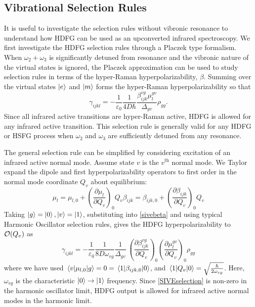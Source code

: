 \documentclass[aip, jcp, reprint, onecolumn, nofootinbib]{revtex4-2}
\begin{document}
\subsection{Vibrational Selection Rules}

It is useful to investigate the selection rules without vibronic resonance to understand how HDFG can be used as an upconverted infrared spectroscopy.
We first investigate the HDFG selection rules through a Placzek type formalism.
When $\omega_2+\omega_3$ is significantly detuned from resonance and the vibronic nature of the virtual states is ignored, the Placzek approximation can be used to study selection rules in terms of the hyper-Raman hyperpolarizability, $\beta$. \cite{Placzek1934, Long1970}
Summing over the virtual states $\ket{e}$ and $\ket{m}$ forms the hyper-Raman hyperpolarizability so that\cite{Long1970} 
\begin{equation}\label{sivebeta}
	\gamma_{ijkl} =	-\frac{1}{\varepsilon_0} \frac{1}{4D \hbar}\frac{\beta^{vg}_{ijk} \mu^{gv}_{l}}{\Delta_{gv}} \rho_{gg}.
\end{equation}
Since all infrared active transitions are hyper-Raman active, HDFG is allowed for any infrared active transition. \cite{Andrews1978}
This selection rule is generally valid for any HDFG or HSFG process when $\omega_2$ and $\omega_3$ are sufficiently detuned from any resonance.

The general selection rule can be simplified by considering excitation of an infrared active normal mode.  
Assume state $v$ is the $v^{\text{th}}$ normal mode.
We Taylor expand the dipole and first hyperpolarizability operators to first order in the normal mode coordinate $Q_v$ about equilibrium:\cite{Long1970, Shen90}
\begin{subequations}
	\begin{equation}
		\mu_l = \mu_{l,0} + \left(\frac{\partial \mu_l}{\partial Q_v}\right)_0 Q_v 
	\end{equation}
	\begin{equation}
		\beta_{ijk} = \beta_{ijk,0} + \left(\frac{\partial \beta_{ijk}}{\partial Q_v}\right)_0 Q_v
	\end{equation}
\end{subequations}
Taking $\ket{g} = \ket{0}, \ket{v} = \ket{1}$, substituting into \autoref{sivebeta} and using typical Harmonic Oscillator selection rules, gives the HDFG hyperpolarizability to $\order{Q_v}$ as \begin{equation}\label{SIVEselection}
	\gamma_{ijkl} =	-\frac{1}{\varepsilon_0} \frac{1}{8D \omega_{vg}}  \frac{1}{{\Delta_{gv}}} \ \left(\frac{\partial \beta^{vg}_{ijk}}{\partial Q_v}\right)_0 \left({\frac{\partial \mu^{gv}_{l}}{\partial Q_v}}\right)_0  \rho_{gg}
\end{equation}
where we have used $\mel{v}{\mu_{l,0}}{g} = 0 = \mel{1}{\beta_{ijk,0}}{0}$, and $\mel{1}{Q_v}{0} = \sqrt{\frac{\hbar}{2\omega_{vg}}}$.
Here, $\omega_{vg}$ is the characteristic $\ket{0} \rightarrow \ket{1}$ frequency.\cite{RN459}
Since \autoref{SIVEselection} is non-zero in the harmonic oscillator limit, HDFG output is allowed for infrared active normal modes in the harmonic limit. 
\end{document}
